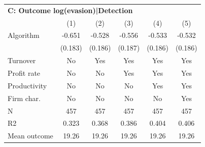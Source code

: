 \begin{tabular}{lccccc}
\midrule \multicolumn{6}{l}{\textbf{C: Outcome log(evasion)|Detection}} \\ \multicolumn{1}{l}{} & (1) & (2) & (3) & (4) & (5) \\ \midrule
Algorithm   &      -0.651\sym{***}&      -0.528\sym{***}&      -0.556\sym{***}&      -0.533\sym{***}&      -0.532\sym{***}\\
            &     (0.183)         &     (0.186)         &     (0.187)         &     (0.186)         &     (0.186)         \\
\midrule
Turnover    &          No         &         Yes         &         Yes         &         Yes         &         Yes         \\
Profit rate &          No         &          No         &         Yes         &         Yes         &         Yes         \\
Productivity&          No         &          No         &          No         &         Yes         &         Yes         \\
Firm char.  &          No         &          No         &          No         &          No         &         Yes         \\
N           &         457         &         457         &         457         &         457         &         457         \\
R2          &       0.323         &       0.368         &       0.386         &       0.404         &       0.406         \\
Mean outcome&       19.26         &       19.26         &       19.26         &       19.26         &       19.26         \\
\bottomrule \end{tabular}
